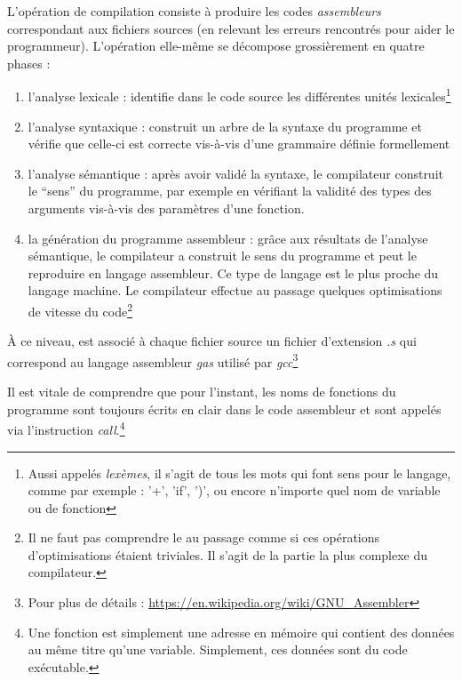 \documentclass[../../../main.tex]{subfiles}
\begin{document}
L'opération de compilation consiste à produire les codes \textit{assembleurs} correspondant aux fichiers sources (en relevant les erreurs rencontrés pour aider le programmeur). L'opération elle-même se décompose grossièrement en quatre phases :
\begin{enumerate}
	\item l'analyse lexicale : identifie dans le code source les différentes unités lexicales\footnote{Aussi appelés \textit{lexèmes}, il s'agit de tous les mots qui font sens pour le langage, comme par exemple : '+', 'if', ')', ou encore n'importe quel nom de variable ou de fonction}
	\item l'analyse syntaxique : construit un arbre de la syntaxe du programme et vérifie que celle-ci est correcte vis-à-vis d'une grammaire définie formellement
	\item l'analyse sémantique : après avoir validé la syntaxe, le compilateur construit le ``sens'' du programme, par exemple en vérifiant la validité des types des arguments vis-à-vis des paramètres d'une fonction.
	\item la génération du programme assembleur : grâce aux résultats de l'analyse sémantique, le compilateur a construit le sens du programme et peut le reproduire en langage assembleur. Ce type de langage est le plus proche du langage machine. Le compilateur effectue au passage quelques optimisations de vitesse du code\footnote{Il ne faut pas comprendre le \og au passage \fg comme si ces opérations d'optimisations étaient triviales. Il s'agit de la partie la plus complexe du compilateur.}
\end{enumerate}
À ce niveau, est associé à chaque fichier source un fichier d'extension \textit{.s} qui correspond au langage assembleur \textit{gas} utilisé par \textit{gcc}\footnote{Pour plus de détails : \url{https://en.wikipedia.org/wiki/GNU_Assembler}}

\begin{minipage}{\textwidth}
	\begin{center}
		
	\end{center}
\end{minipage}

Il est vitale de comprendre que pour l'instant, les noms de fonctions du programme sont toujours écrits en clair dans le code assembleur et sont appelés via l'instruction \textit{call}.\footnote{Une fonction est simplement une adresse en mémoire qui contient des données au même titre qu'une variable. Simplement, ces données sont du code exécutable.}
\end{document}
